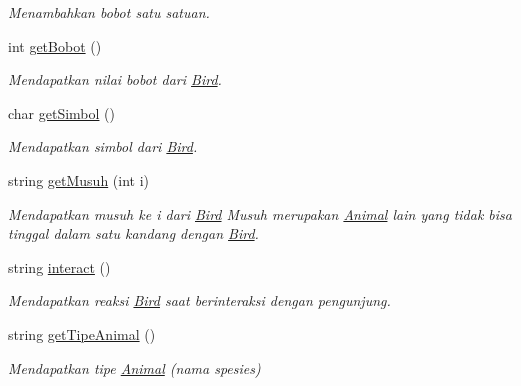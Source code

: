 \begin{DoxyCompactItemize}
\begin{DoxyCompactList}\small\item\em Menambahkan bobot satu satuan. \end{DoxyCompactList}\item 
int \hyperlink{classBird_a72a377b7d210dc3cabd57d61538eeeac}{get\-Bobot} ()
\begin{DoxyCompactList}\small\item\em Mendapatkan nilai bobot dari \hyperlink{classBird}{Bird}. \end{DoxyCompactList}\item 
char \hyperlink{classBird_a842d9c5760dd027cc293b869b7a5c9f7}{get\-Simbol} ()
\begin{DoxyCompactList}\small\item\em Mendapatkan simbol dari \hyperlink{classBird}{Bird}. \end{DoxyCompactList}\item 
string \hyperlink{classBird_a957350fef42a0a16446abfd9a14a8f07}{get\-Musuh} (int i)
\begin{DoxyCompactList}\small\item\em Mendapatkan musuh ke i dari \hyperlink{classBird}{Bird} Musuh merupakan \hyperlink{classAnimal}{Animal} lain yang tidak bisa tinggal dalam satu kandang dengan \hyperlink{classBird}{Bird}. \end{DoxyCompactList}\item 
string \hyperlink{classBird_ae1e5a507154e6aeb2ba9f3c8447c75d4}{interact} ()
\begin{DoxyCompactList}\small\item\em Mendapatkan reaksi \hyperlink{classBird}{Bird} saat berinteraksi dengan pengunjung. \end{DoxyCompactList}\item 
string \hyperlink{classBird_a334d9a9e90114f5c74d2ad327120b2be}{get\-Tipe\-Animal} ()
\begin{DoxyCompactList}\small\item\em Mendapatkan tipe \hyperlink{classAnimal}{Animal} (nama spesies) \end{DoxyCompactList}\end{DoxyCompactItemize}
